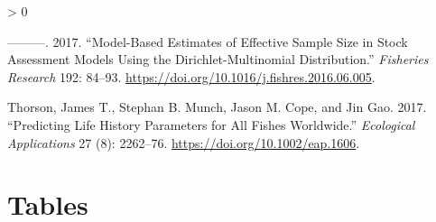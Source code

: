 \documentclass[11pt,
  english,
  a4paper,
]{article}
\newlength{\cslhangindent}
\newenvironment{CSLReferences}[2] %
 {%
  \setlength{\parindent}{0pt}
  \ifodd #1 \everypar{\setlength{\hangindent}{\cslhangindent}}\ignorespaces\fi
  \ifnum #2 > 0
  \setlength{\parskip}{#2\baselineskip}
  \fi
 }%
 {}
\begin{document}
\begin{CSLReferences}{1}{0}
\leavevmode\hypertarget{ref-thorson_model-based_2017}{}%
---------. 2017. {``Model-Based Estimates of Effective Sample Size in Stock Assessment Models Using the {Dirichlet}-Multinomial Distribution.''} \emph{Fisheries Research} 192: 84--93. \url{https://doi.org/10.1016/j.fishres.2016.06.005}.

\leavevmode\hypertarget{ref-thorson_predicting_2017}{}%
Thorson, James T., Stephan B. Munch, Jason M. Cope, and Jin Gao. 2017. {``Predicting Life History Parameters for All Fishes Worldwide.''} \emph{Ecological Applications} 27 (8): 2262--76. \url{https://doi.org/10.1002/eap.1606}.

\end{CSLReferences}

\leavevmode\tagmcend\tagstructend

\clearpage


\hypertarget{tables}{%
\section{Tables}\label{tables}}

\leavevmode\tagmcend\tagstructend



\newpage

\begingroup\fontsize{10}{12}\selectfont
\begingroup\fontsize{10}{12}\selectfont
\end{document}
